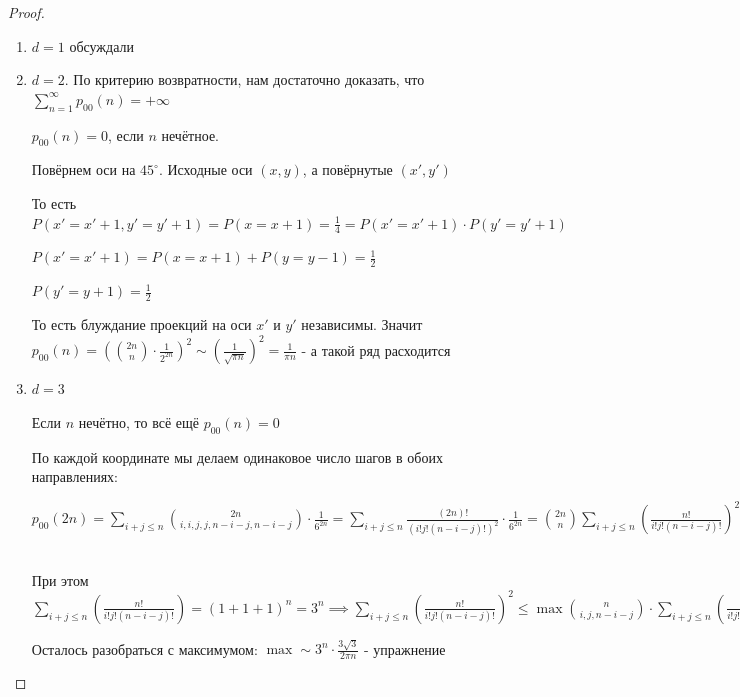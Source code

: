\begin{proof}
    \begin{enumerate}
        \item $d = 1$ обсуждали
        \item {
            $d = 2$. По критерию возвратности, нам достаточно доказать, что $\sum\limits_{n=1}^\infty p_{00} (n) = +\infty$

            $p_{00} (n) = 0$, если $n$ нечётное. 
            
            Повёрнем оси на $45^{\circ}$. Исходные оси $(x, y)$, а повёрнутые $(x', y')$

            То есть $P(x' = x' + 1, y' = y' + 1) = P(x = x + 1) = \frac{1}{4} = P(x' = x' + 1) \cdot P(y' = y' + 1)$

            $P(x' = x' + 1) = P(x = x + 1) + P(y = y - 1) = \frac{1}{2}$

            $P(y' = y + 1) = \frac{1}{2}$

            То есть блуждание проекций на оси $x'$ и $y'$ независимы. Значит $p_{00}(n) =
            \left( \binom{2n}{n} \cdot \frac{1}{2^{2n}} \right)^2 \sim \left( \frac{1}{\sqrt{\pi n}} \right)^2 = \frac{1}{\pi n}$ - а такой ряд расходится
        }
        \item {
            $d = 3$

            Если $n$ нечётно, то всё ещё $p_{00} (n) = 0$

            По каждой координате мы делаем одинаковое число шагов в обоих направлениях: 
            
            $p_{00} (2n) = \sum\limits_{i + j \leqslant n} \binom{2n}{i, i, j, j, n - i -j, n - i - j} \cdot \frac{1}{6^{2n}} = \sum\limits_{i + j \leqslant n} \frac{(2n)!}{(i!j!(n-i-j)!)^2} \cdot \frac{1}{6^{2n}} = 
            \binom{2n}{n} \sum\limits_{i + j \leqslant n} \left( \frac{n!}{i!j!(n - i - j)!} \right)^2 \cdot \frac{1}{6^{2n}} = \overset{*}{\leqslant} \underbrace{\frac{\binom{2n}{n}}{6^{2n}} \cdot 3^n}_{\sim \frac{1}{\sqrt{\pi n} \cdot \frac{1}{3^n}}} \cdot \max \binom{n}{i, j, n - i - j} $

            При этом $\sum\limits_{i + j \leqslant n} \left( \frac{n!}{i!j!(n - i - j)!} \right) = (1 + 1 + 1)^n = 3^n \implies \sum\limits_{i + j \leqslant n} \left( \frac{n!}{i!j!(n - i - j)!} \right)^2 \leqslant \max \binom{n}{i, j, n - i - j} \cdot \sum\limits_{i + j \leqslant n} \left( \frac{n!}{i!j!(n - i - j)!} \right) \sim (*)$

            Осталось разобраться с максимумом: $\max \sim 3^n \cdot \frac{3\sqrt{3}}{2 \pi n}$ - упражнение

}
\end{enumerate}
\end{proof}
